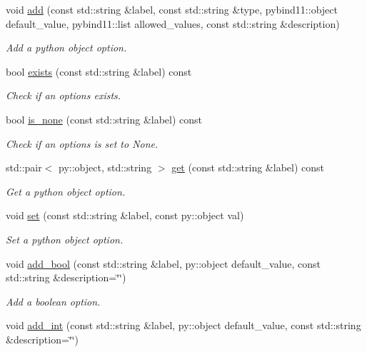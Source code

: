 \begin{DoxyCompactItemize}
void \mbox{\hyperlink{classforte_1_1_forte_options_a85fb97b8a8f426fb29f8de7e3a40d50e}{add}} (const std\+::string \&label, const std\+::string \&type, pybind11\+::object default\+\_\+value, pybind11\+::list allowed\+\_\+values, const std\+::string \&description)
\begin{DoxyCompactList}\small\item\em Add a python object option. \end{DoxyCompactList}\item 
bool \mbox{\hyperlink{classforte_1_1_forte_options_ab29512318f351d9ae5a1fb386aaa829f}{exists}} (const std\+::string \&label) const
\begin{DoxyCompactList}\small\item\em Check if an options exists. \end{DoxyCompactList}\item 
bool \mbox{\hyperlink{classforte_1_1_forte_options_aaabb27801a162d6a5eddd14bd1acb40a}{is\+\_\+none}} (const std\+::string \&label) const
\begin{DoxyCompactList}\small\item\em Check if an options is set to None. \end{DoxyCompactList}\item 
std\+::pair$<$ py\+::object, std\+::string $>$ \mbox{\hyperlink{classforte_1_1_forte_options_a4c5964f66003ea681399fd60256443a0}{get}} (const std\+::string \&label) const
\begin{DoxyCompactList}\small\item\em Get a python object option. \end{DoxyCompactList}\item 
void \mbox{\hyperlink{classforte_1_1_forte_options_aed9ba828204eb3e0650a79542c1127bf}{set}} (const std\+::string \&label, const py\+::object val)
\begin{DoxyCompactList}\small\item\em Set a python object option. \end{DoxyCompactList}\item 
void \mbox{\hyperlink{classforte_1_1_forte_options_a092e24b04792bb14b066e07463fb66a3}{add\+\_\+bool}} (const std\+::string \&label, py\+::object default\+\_\+value, const std\+::string \&description=\char`\"{}\char`\"{})
\begin{DoxyCompactList}\small\item\em Add a boolean option. \end{DoxyCompactList}\item 
void \mbox{\hyperlink{classforte_1_1_forte_options_a90ea17b4ef419b95c73e69eb6cf07fdc}{add\+\_\+int}} (const std\+::string \&label, py\+::object default\+\_\+value, const std\+::string \&description=\char`\"{}\char`\"{})

\end{DoxyCompactItemize}
